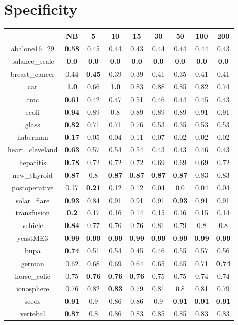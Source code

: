 \documentclass{article}%
\begin{document}
%
\section*{Specificity}%
\begin{tabular}{c|cccccccc}%
\hline%
&NB&5&10&15&30&50&100&200\\%
\hline%
abalone16\_29&\textbf{0.58}&0.45&0.44&0.43&0.44&0.44&0.44&0.43\\%
\hline%
balance\_scale&\textbf{0.0}&\textbf{0.0}&\textbf{0.0}&\textbf{0.0}&\textbf{0.0}&\textbf{0.0}&\textbf{0.0}&\textbf{0.0}\\%
\hline%
breast\_cancer&0.44&\textbf{0.45}&0.39&0.39&0.41&0.35&0.41&0.41\\%
\hline%
car&\textbf{1.0}&0.66&\textbf{1.0}&0.83&0.88&0.85&0.82&0.74\\%
\hline%
cmc&\textbf{0.61}&0.42&0.47&0.51&0.46&0.44&0.45&0.43\\%
\hline%
ecoli&\textbf{0.94}&0.89&0.8&0.89&0.89&0.89&0.91&0.91\\%
\hline%
glass&\textbf{0.82}&0.71&0.71&0.76&0.53&0.35&0.53&0.53\\%
\hline%
haberman&\textbf{0.17}&0.05&0.04&0.11&0.07&0.02&0.02&0.02\\%
\hline%
heart\_cleveland&\textbf{0.63}&0.57&0.54&0.54&0.43&0.43&0.46&0.43\\%
\hline%
hepatitis&\textbf{0.78}&0.72&0.72&0.72&0.69&0.69&0.69&0.72\\%
\hline%
new\_thyroid&\textbf{0.87}&0.8&\textbf{0.87}&\textbf{0.87}&\textbf{0.87}&\textbf{0.87}&0.83&0.83\\%
\hline%
postoperative&0.17&\textbf{0.21}&0.12&0.12&0.04&0.0&0.04&0.04\\%
\hline%
solar\_flare&\textbf{0.93}&0.84&0.91&0.91&0.91&\textbf{0.93}&0.91&0.91\\%
\hline%
transfusion&\textbf{0.2}&0.17&0.16&0.14&0.15&0.16&0.15&0.14\\%
\hline%
vehicle&\textbf{0.84}&0.77&0.76&0.76&0.81&0.79&0.8&0.8\\%
\hline%
yeastME3&\textbf{0.99}&\textbf{0.99}&\textbf{0.99}&\textbf{0.99}&\textbf{0.99}&\textbf{0.99}&\textbf{0.99}&\textbf{0.99}\\%
\hline%
bupa&\textbf{0.74}&0.51&0.54&0.45&0.46&0.55&0.57&0.56\\%
\hline%
german&0.62&0.68&0.69&0.64&0.65&0.65&0.71&\textbf{0.74}\\%
\hline%
horse\_colic&0.75&\textbf{0.76}&\textbf{0.76}&\textbf{0.76}&0.75&0.75&0.74&0.74\\%
\hline%
ionosphere&0.76&0.82&\textbf{0.83}&0.79&0.81&0.8&0.81&0.79\\%
\hline%
seeds&\textbf{0.91}&0.9&0.86&0.86&0.9&\textbf{0.91}&\textbf{0.91}&\textbf{0.91}\\%
\hline%
vertebal&\textbf{0.87}&0.8&0.86&0.83&0.85&0.85&0.83&0.83\\%
\hline%
\end{tabular}
\end{document}
